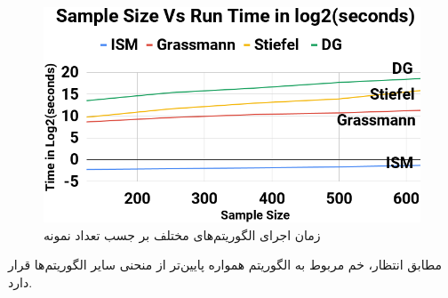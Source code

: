 \begin{figure}[h!]
	\centering
	\includegraphics[scale = 0.35]{./Figures/runtime.png}
	\caption{زمان اجرای الگوریتم‌های مختلف بر جسب تعداد نمونه}
\end{figure}

مطابق انتظار، خم مربوط به الگوریتم 
همواره پایین‌تر از منحنی سایر الگوریتم‌ها قرار دارد.
